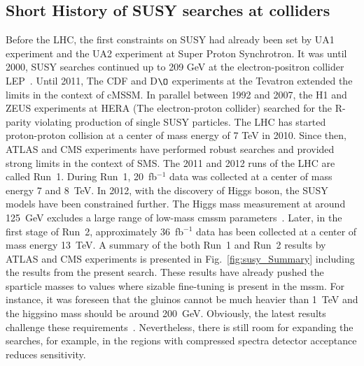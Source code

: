 \subsection{Short History of SUSY searches at colliders}
\label{sec:histSus}
Before the LHC, the first constraints on SUSY had already been set by UA1 experiment and the UA2 experiment at Super Proton Synchrotron. It was until 2000, SUSY searches continued up to 209 GeV at the electron-positron collider LEP~\cite{pdg_old}. Until 2011, The CDF and D$\O$ experiments at the Tevatron extended the limits in the context of cMSSM. In parallel between 1992 and 2007, the H1 and ZEUS experiments at HERA (The electron-proton collider) searched for the R-parity violating production of single SUSY particles. The LHC has started proton-proton collision at a center of mass energy of 7 TeV in 2010. Since then, ATLAS and CMS experiments have performed robust searches and provided strong limits in the context of SMS. The 2011 and 2012 runs of the LHC are called Run~1. During Run~1, 20~fb$^{-1}$ data was collected at a center of mass energy 7 and 8~TeV. In 2012, with the discovery of Higgs boson, the SUSY models have been constrained further. The Higgs mass measurement at around 125~GeV excludes a large range of low-mass \acrshort{cmssm} parameters~\cite{ellis,ellis2}. Later, in the first stage of Run~2, approximately 36~fb$^{-1}$ data has been collected at a center of mass energy 13~TeV. A summary of the both Run~1 and Run~2 results by ATLAS and CMS experiments is presented in Fig.~\ref{fig:susy_Summary} including the results from the present search. These results have already pushed the sparticle masses to values where sizable fine-tuning is present in the \acrshort{mssm}. For instance, it was foreseen that the gluinos cannot be much heavier than 1~TeV and the higgsino mass should be around 200~GeV.  Obviously, the latest results challenge these requirements~\cite{corneringSUSY}.  Nevertheless, there is still room for expanding the searches, for example, in the regions with compressed spectra detector acceptance reduces sensitivity.
